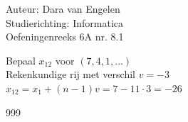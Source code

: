 \documentclass[a4paper]{article}
\begin{document}
	
\noindent \large Auteur: Dara van Engelen     \\
\noindent \large Studierichting: Informatica \\
\noindent \large Oefeningenreeks 6A nr. 8.1  \\
	
\medskip
	
\normalsize

Bepaal $x_{12}$ voor $(7,4,1,...)$\\

Rekenkundige rij met verschil $v = -3$\\

$x_{12}= x_1 + (n-1)v = 7 -11 \cdot 3 = -26$

	
\begin{thebibliography}{999}
\end{thebibliography}
\end{document}
